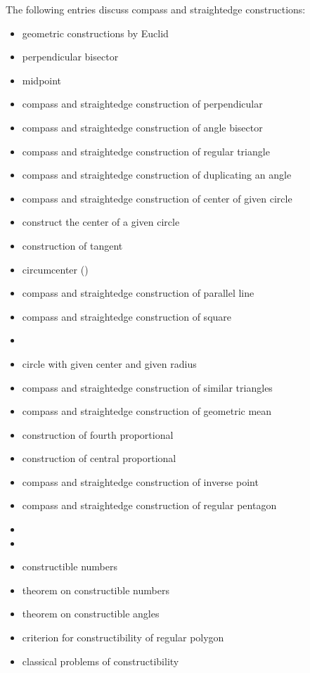 \documentclass[12pt]{article}
\begin{document}
The following entries discuss compass and straightedge constructions:

\begin{multicols}{2}
\begin{itemize}
\item geometric constructions by Euclid
\item perpendicular bisector
\item midpoint
\item compass and straightedge construction of perpendicular
\item compass and straightedge construction of angle bisector
\item compass and straightedge construction of regular triangle
\item compass and straightedge construction of duplicating an angle
\item compass and straightedge construction of center of given circle
\item construct the center of a given circle
\item construction of tangent
\item circumcenter ()
\item compass and straightedge construction of parallel line
\item compass and straightedge construction of square
\item {}
\item circle with given center and given radius
\item compass and straightedge construction of similar triangles
\item compass and straightedge construction of geometric mean
\item construction of fourth proportional
\item construction of central proportional
\item compass and straightedge construction of inverse point
\item compass and straightedge construction of regular pentagon
\item {}
\item {}
\item constructible numbers
\item theorem on constructible numbers
\item theorem on constructible angles
\item criterion for constructibility of regular polygon
\item classical problems of constructibility
\end{itemize}
\end{multicols}
\end{document}

